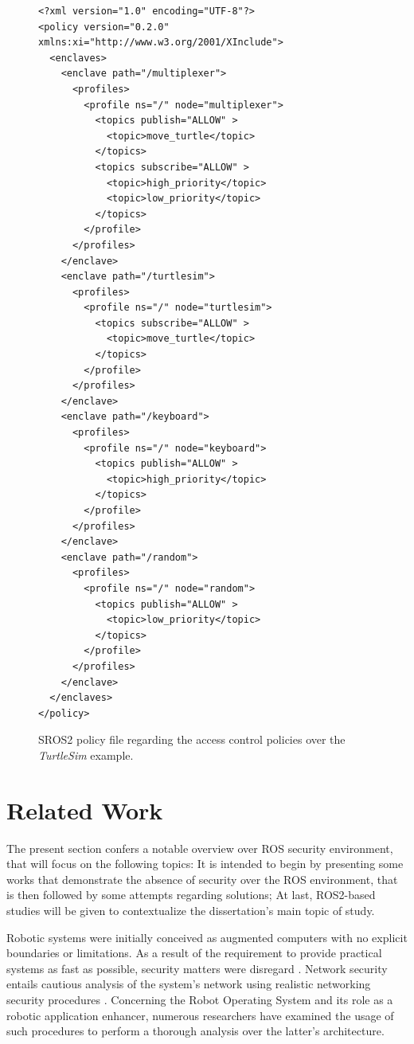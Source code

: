 \begin{figure}[H]
\begin{lstlisting}[otherkeywords = {xml, version, encoding, policy, version, enclave, enclaves, profile, profiles, topic, topics, xmlns:xi, path, ns, node, publish, subscribe, reply, request, call, execute, xi:include, href, xpointer}]
<?xml version="1.0" encoding="UTF-8"?>
<policy version="0.2.0" xmlns:xi="http://www.w3.org/2001/XInclude">
  <enclaves>
    <enclave path="/multiplexer">
      <profiles>
        <profile ns="/" node="multiplexer">
          <topics publish="ALLOW" >
            <topic>move_turtle</topic>
          </topics>
          <topics subscribe="ALLOW" >
            <topic>high_priority</topic>
            <topic>low_priority</topic>
          </topics>
        </profile>
      </profiles>
    </enclave>
    <enclave path="/turtlesim">
      <profiles>
        <profile ns="/" node="turtlesim">
          <topics subscribe="ALLOW" >
            <topic>move_turtle</topic>
          </topics>
        </profile>
      </profiles>
    </enclave>
    <enclave path="/keyboard">
      <profiles>
        <profile ns="/" node="keyboard">
          <topics publish="ALLOW" >
            <topic>high_priority</topic>
          </topics>
        </profile>
      </profiles>
    </enclave>
    <enclave path="/random">
      <profiles>
        <profile ns="/" node="random">
          <topics publish="ALLOW" >
            <topic>low_priority</topic>
          </topics>
        </profile>
      </profiles>
    </enclave>
  </enclaves>
</policy>
\end{lstlisting}
\caption{SROS2 policy file regarding the access control policies over the \textit{TurtleSim} example.}
\label{fig:ros-access-file}
\end{figure}

\section{Related Work}\label{s:relWork-sec}

The present section confers a notable overview over ROS security environment, that will focus on the following topics: It is intended to begin by presenting some works that demonstrate the absence of security over the ROS environment, that is then followed by some attempts regarding solutions; At last, ROS2-based studies will be given to contextualize the dissertation's main topic of study. 

Robotic systems were initially conceived as augmented computers with no explicit boundaries or limitations. As a result of the requirement to provide practical systems as fast as possible, security matters were disregard \cite{white2018procedurally}. Network security entails cautious analysis of the system's network using realistic networking security procedures \cite{marin2005network}. Concerning the Robot Operating System and its role as a robotic application enhancer, numerous researchers have examined the usage of such procedures to perform a thorough analysis over the latter's architecture.

